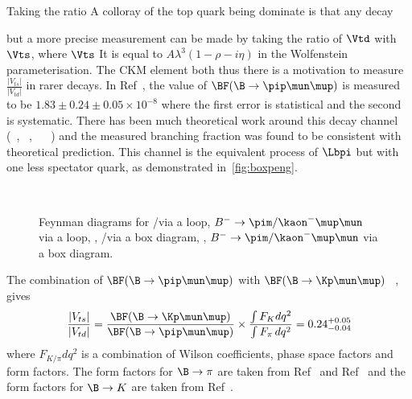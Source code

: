 Taking the ratio 
A colloray of the top quark being dominate is that any decay 



but a more precise measurement can be made by taking the ratio of $\Vtd$ with $\Vts$, where $\Vts$  It is equal to $A\lambda^{3}(1 - \rho - i \eta)$ in the Wolfenstein parameterisation. The CKM element both  thus there is a motivation to measure $\frac{|V_{ts}|}{|V_{td}|}$ in rarer decays.
In Ref~\cite{pimumunew}, the value of $\BF(\B\to\pip\mun\mup)$ is measured to be $1.83\pm0.24\pm0.05 \times 10^{-8}$ where the first error is statistical and the second is systematic. There has been much theoretical work around this decay channel (~\cite{bpipi_th_1}, ~\cite{bpipi_th_2}, ~\cite{bpipi_th_3} ~\cite{bpipi_th_4}) and the measured branching fraction was found to be consistent with theoretical prediction.  This channel is the equivalent process of $\Lbpi$ but with one less spectator quark, as demonstrated in~\autoref{fig:boxpeng}.

\begin{figure}[!h]\def\nh{0.5\textwidth}
  \centering
  \hspace*{-1cm}
  \\
  \hspace*{-1cm}
  \caption{Feynman diagrams for \protect{} \Lb\to\proton\pim/\Km\mup\mun via a loop,  \protect{} $B^{-}\to\pim/\kaon^{-}\mup\mun$ via a loop,  \protect{}, \Lb\to\proton\pim/\Km\mup\mun via a box diagram,
   \protect{}, $B^{-}\to\pim/\kaon^{-}\mup\mun$ via a box diagram.
  }
  \label{fig:boxpeng}
\end{figure}
The combination of $\BF(\B\to\pip\mun\mup)$ with $\BF(\B\to\Kp\mun\mup)$ ~\cite{bKmumu},  gives
\begin{equation}
  \frac{|V_{ts}|}{|V_{td}|} = \frac{\BF(\B\to\Kp\mun\mup)}{\BF(\B\to\pip\mun\mup)} \times \frac{\int F_{K}d q^{2}}{\int F_{\pi}\,dq^{2}} = 0.24^{+0.05}_{-0.04}
  \end{equation}
where $F_{K/\pi}d q^{2}$ is a combination of Wilson coefficients, phase space factors and form factors. The form factors for $\B\to\pi$ are taken from Ref~\cite{bpimumuff1} and Ref~\cite{bpimumuff2} and the form factors for $\B\to K$ are taken from Ref~\cite{bKmumuff1}.

